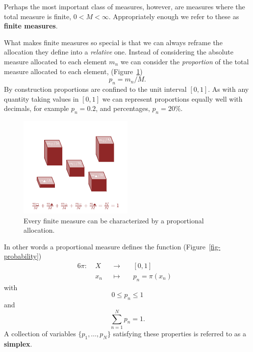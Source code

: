 \documentclass[
  letterpaper,
  DIV=11,
  numbers=noendperiod]{scrartcl}
\begin{document}
Perhaps the most important class of measures, however, are measures
where the total measure is finite, \(0 < M < \infty\). Appropriately
enough we refer to these as \textbf{finite measures}.

What makes finite measures so special is that we can always reframe the
allocation they define into a \emph{relative} one. Instead of
considering the absolute measure allocated to each element \(m_{n}\) we
can consider the \emph{proportion} of the total measure allocated to
each element, (Figure~\ref{fig-proportional}) \[
p_{n} = m_{n} / M.
\] By construction proportions are confined to the unit interval
\([0, 1]\). As with any quantity taking values in \([0, 1]\) we can
represent proportions equally well with decimals, for example
\(p_{n} = 0.2\), and percentages, \(p_{n} = 20\%\).

\begin{figure}

{\centering \includegraphics[width=0.5\textwidth,height=\textheight]{figures/proportional_measure/proportional_measure.pdf}

}

\caption{\label{fig-proportional}Every finite measure can be
characterized by a proportional allocation.}

\end{figure}

In other words a proportional measure defines the function
(Figure~\ref{fig-probability}) \begin{alignat*}{6}
\pi :\; & X & &\rightarrow& \; & [0, 1] &
\\
& x_{n} & &\mapsto& & p_{n} = \pi(x_{n}) &
\end{alignat*} with \[
0 \le p_{n} \le 1
\] and \[
\sum_{n = 1}^{N} p_{n} = 1.
\] A collection of variables \(\{ p_{1}, \ldots, p_{N} \}\) satisfying
these properties is referred to as a \textbf{simplex}.
\end{document}
